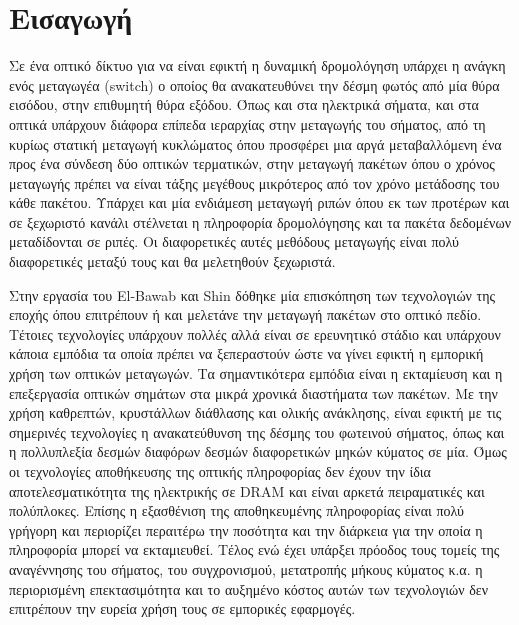 \section{Εισαγωγή}

Σε ένα οπτικό δίκτυο για να είναι εφικτή η δυναμική δρομολόγηση
υπάρχει η ανάγκη ενός μεταγωγέα (switch) ο οποίος θα ανακατευθύνει την
δέσμη φωτός από μία θύρα εισόδου, στην επιθυμητή θύρα εξόδου. Όπως και
στα ηλεκτρικά σήματα, και στα οπτικά υπάρχουν διάφορα επίπεδα
ιεραρχίας στην μεταγωγής του σήματος, από τη κυρίως στατική μεταγωγή
κυκλώματος όπου προσφέρει μια αργά μεταβαλλόμενη ένα προς ένα σύνδεση
δύο οπτικών τερματικών, στην μεταγωγή πακέτων όπου ο χρόνος μεταγωγής
πρέπει να είναι τάξης μεγέθους μικρότερος από τον χρόνο μετάδοσης του
κάθε πακέτου. Υπάρχει και μία ενδιάμεση μεταγωγή ριπών όπου εκ των
προτέρων και σε ξεχωριστό κανάλι στέλνεται η πληροφορία δρομολόγησης
και τα πακέτα δεδομένων μεταδίδονται σε ριπές. Οι διαφορετικές αυτές
μεθόδους μεταγωγής είναι πολύ διαφορετικές μεταξύ τους και θα
μελετηθούν ξεχωριστά.


Στην εργασία του El-Bawab και Shin \cite{1031830} δόθηκε μία
επισκόπηση των τεχνολογιών της εποχής όπου επιτρέπουν ή και μελετάνε
την μεταγωγή πακέτων στο οπτικό πεδίο. Τέτοιες τεχνολογίες υπάρχουν
πολλές αλλά είναι σε ερευνητικό στάδιο και υπάρχουν κάποια εμπόδια τα
οποία πρέπει να ξεπεραστούν ώστε να γίνει εφικτή η εμπορική χρήση των
οπτικών μεταγωγών. Τα σημαντικότερα εμπόδια είναι η εκταμίευση και η
επεξεργασία οπτικών σημάτων στα μικρά χρονικά διαστήματα των
πακέτων. Με την χρήση καθρεπτών, κρυστάλλων διάθλασης και ολικής
ανάκλησης, είναι εφικτή με τις σημερινές τεχνολογίες η ανακατεύθυνση
της δέσμης του φωτεινού σήματος, όπως και η πολλυπλεξία δεσμών
διαφόρων δεσμών διαφορετικών μηκών κύματος σε μία. Όμως οι τεχνολογίες
αποθήκευσης της οπτικής πληροφορίας δεν έχουν την ίδια
αποτελεσματικότητα της ηλεκτρικής σε DRAM και είναι αρκετά
πειραματικές και πολύπλοκες. Επίσης η εξασθένιση της αποθηκευμένης
πληροφορίας είναι πολύ γρήγορη και περιορίζει περαιτέρω την ποσότητα
και την διάρκεια για την οποία η πληροφορία μπορεί να
εκταμιευθεί. Τέλος ενώ έχει υπάρξει πρόοδος τους τομείς της
αναγέννησης του σήματος, του συγχρονισμού, μετατροπής μήκους κύματος
κ.α. η περιορισμένη επεκτασιμότητα και το αυξημένο κόστος αυτών των
τεχνολογιών δεν επιτρέπουν την ευρεία χρήση τους σε εμπορικές
εφαρμογές.




